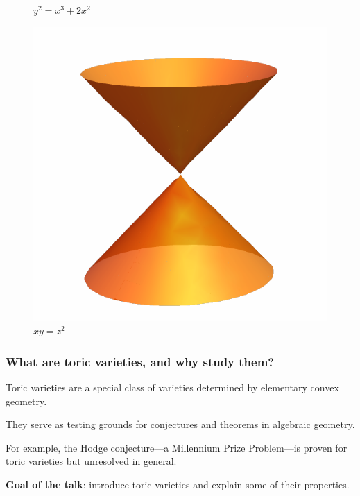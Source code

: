 \documentclass{beamer}
\theoremstyle{definition}
\theoremstyle{definition}
\begin{document}
\begin{frame}
\begin{minipage}[t]{0.49\textwidth}
\begin{figure}
\caption*{$y^2=x^3+2x^2$}
\end{figure}
\end{minipage}
\hfill
\begin{minipage}[t]{0.49\textwidth}
    \centering
\vspace{-0.2cm}
\pause
\begin{figure}
    \includegraphics[width=0.7\linewidth]{orange_cone}
	\vspace{-.25cm}
    \caption*{$xy=z^2$}
\end{figure}
\end{minipage}
\end{frame}

\begin{frame}
\frametitle{What are toric varieties, and why study them?}

\pause
\alert{Toric varieties} are a special class of varieties determined by elementary \alert{convex} geometry.

\pause
They serve as testing grounds for conjectures and theorems in algebraic geometry.

\pause
For example, the \alert{Hodge conjecture}---a Millennium Prize Problem---is proven for toric varieties but unresolved in general.

\pause
\textbf{Goal of the talk}: introduce toric varieties and explain some of their properties.

\end{frame}
\end{document}
